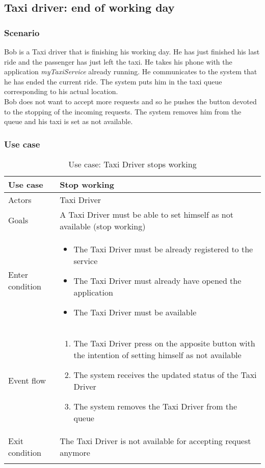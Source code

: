 \pagebreak
\subsection{Taxi driver: end of working day}
\subsubsection{Scenario}
Bob is a Taxi driver that is finishing his working day. He has just finished his last ride and the passenger has just left the taxi. He takes his phone with the application \textit{myTaxiService} already running. He communicates to the system that he has ended the current ride. The system puts him in the taxi queue corresponding to his actual location.\\
Bob does not want to accept more requests and so he pushes the button devoted to the stopping of the incoming requests. The system removes him from the queue and his taxi is set as not available.

\subsubsection{Use case}
\begin{center}
\begin{longtable}{| p{} | p{} |} \hline
	Use case & \textbf{Stop working} \\ \hline 
	Actors & Taxi Driver \\ \hline
	Goals & A Taxi Driver must be able to set himself as not available (stop working)  \\ \hline
	Enter condition & \begin{itemize}
						\item The Taxi Driver must be already registered to the service
						\item The Taxi Driver must already have opened the application
						\item The Taxi Driver must be available
						\end{itemize} \\ \hline
	Event flow & \begin{enumerate}
					\item The Taxi Driver press on the apposite button with the intention of setting himself as not available
					\item The system receives the updated status of the Taxi Driver
					\item The system removes the Taxi Driver from the queue
				\end{enumerate} \\ \hline
	Exit condition & The Taxi Driver is not available for accepting request anymore \\ \hline
	\caption{Use case: Taxi Driver stops working}
\end{longtable}
\end{center}
